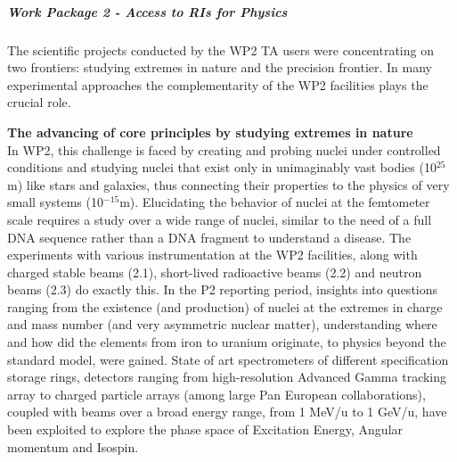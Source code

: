 %
% 












\subparagraph{Work Package 2 - Access to RIs for Physics}

The scientific projects conducted by the WP2 TA users were concentrating on two frontiers: studying extremes in nature and the precision frontier. In many experimental approaches the complementarity of the WP2 facilities plays the crucial role.

\textbf{The advancing of core principles by studying extremes in nature}\\ 
In WP2, this challenge is faced by creating and probing nuclei under controlled conditions and studying nuclei that exist only in unimaginably vast bodies (10$^{25}$m) like stars and galaxies, thus connecting their properties to the physics of very small systems (10$^{-15}$m). 
Elucidating the behavior of nuclei at the femtometer scale requires a study over a wide range of nuclei, %
similar to the need of a full DNA sequence rather than a DNA fragment to understand a disease. The experiments with various instrumentation at the WP2 facilities, along with charged stable beams (2.1), short-lived radioactive beams (2.2) and neutron beams (2.3)  do exactly this. In the P2 reporting period, insights into questions ranging from the existence (and production) of nuclei at the extremes in charge and mass number (and very asymmetric nuclear matter), understanding where and how did the elements from iron to uranium originate,
to physics beyond the standard model, were gained. State of art spectrometers of different specification storage rings, detectors ranging from high-resolution Advanced Gamma tracking array to charged particle arrays (among large Pan European collaborations), coupled with beams over a broad energy range, from 1 MeV/u to 1 GeV/u, have been exploited to explore the phase space of Excitation Energy, Angular momentum and Isospin. 

